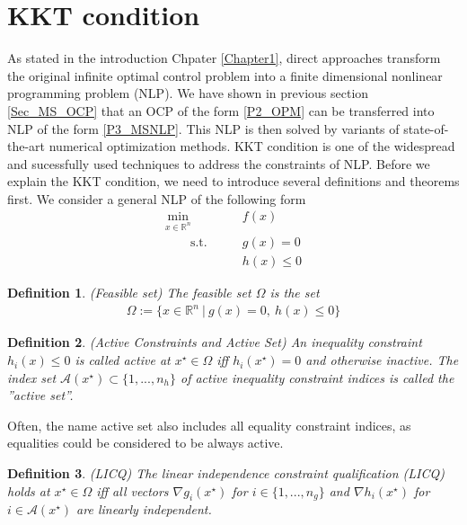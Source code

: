 \documentclass  [
  paper    = a4,
  BCOR     = 10mm,
  twoside,
  fontsize = 12pt,
  fleqn,
  toc      = bibnumbered,
  toc      = listofnumbered,
  numbers  = noendperiod,
  headings = normal,
  listof   = leveldown,
  version  = 3.03
]                                       {scrreprt}
\newcommand{\<}{\langle}
\renewcommand{\>}{\rangle}
\newtheorem{definition}{Definition}
\begin{document}
\section{KKT condition}
\label{Sec_KKT}
As stated in the introduction Chpater \ref{Chapter1}, direct approaches transform the original infinite optimal control problem into a finite dimensional nonlinear programming problem (NLP). We have shown in previous section \ref{Sec_MS_OCP} that an OCP of the form \ref{P2_OPM} can be transferred into NLP of the form \ref{P3_MSNLP}. This NLP is then solved by variants of state-of-the-art numerical optimization methods. KKT condition is one of the widespread and sucessfully used techniques to address the constraints of NLP.  Before we explain the KKT condition, we need to introduce several definitions and theorems first. We consider a general NLP of the following form
\begin{equation}
	\label{eq:OCP_discret_compact}
	\begin{aligned}
		\underset{x \in \mathbb{R}^n}{\text{min}} \qquad &f(x)	\\
		\qquad \text{s.t.}\qquad	&  g(x)	 = 0   \\
		&  h(x)	\leq 0 
	\end{aligned}
\end{equation}
\begin{definition}(Feasible set) The feasible set $\Omega$ is the set 
	\begin{align}
		\Omega:= \{x \in \mathbb{R}^n \ | \ g(x)= 0 , \ h(x)	\leq 0 \}	
	\end{align}
\end{definition}	
\begin{definition}(Active Constraints and Active Set) An inequality constraint $h_i(x) \leq 0$ is called active at $x^\star \in  \Omega$  iff  $h_i(x^\star) = 0$ and otherwise inactive. The index set $\mathcal{A}(x^\star) \subset \{1, ..., n_h\}$  of active inequality constraint indices is called the ”active set”.
\end{definition}
Often, the name active set also includes all equality constraint indices, as equalities could be considered to be always active. 
\begin{definition} (LICQ) The linear independence constraint qualification (LICQ) holds at $x^\star \in  \Omega $ iff all vectors $\nabla g_i(x^\star)$ for $i \in \{1, ..., n_g \}$ and $\nabla h_i(x^\star)$ for  $i \in \mathcal{A}(x^\star)$ are linearly independent.
	\label{df_LICO}
\end{definition}
\end{document}
